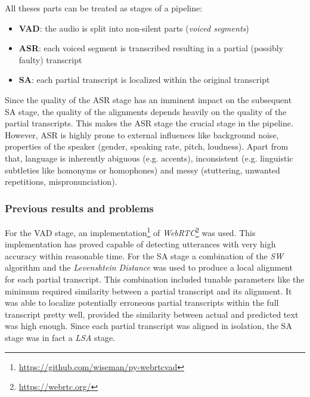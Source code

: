 All theses parts can be treated as stages of a pipeline:

\begin{itemize}
	\item \textbf{\ac{VAD}}: the audio is split into non-silent parts (\textit{voiced segments})
	\item \textbf{\ac{ASR}}: each voiced segment is transcribed resulting in a partial (possibly faulty) transcript
	\item \textbf{\ac{SA}}: each partial transcript is localized within the original transcript	
\end{itemize}

Since the quality of the \ac{ASR} stage has an imminent impact on the subsequent \ac{SA} stage, the quality of the alignments depends heavily on the quality of the partial transcripts. This makes the \ac{ASR} stage the crucial stage in the pipeline. However, \ac{ASR} is highly prone to external influences like background noise, properties of the speaker (gender, speaking rate, pitch, loudness). Apart from that, language is inherently abiguous (e.g. accents), inconsistent (e.g. linguistic subtleties like homonyms or homophones) and messy (stuttering, unwanted repetitions, mispronunciation).

\subsubsection{Previous results and problems}
For the \ac{VAD} stage, an implementation\footnote{\url{https://github.com/wiseman/py-webrtcvad}} of \textit{WebRTC}\footnote{\url{https://webrtc.org/}} was used. This implementation has proved capable of detecting utterances with very high accuracy within reasonable time. For the \ac{SA} stage a combination of the \textit{\ac{SW}} algorithm and the \textit{Levenshtein Distance} was used to produce a local alignment for each partial transcript. This combination included tunable parameters like the minimum required similarity between a partial transcript and its alignment. It was able to localize potentially erroneous partial transcripts within the full transcript pretty well, provided the similarity between actual and predicted text was high enough. Since each partial transcript was aligned in isolation, the \ac{SA} stage was in fact a \textit{\ac{LSA}} stage. 

